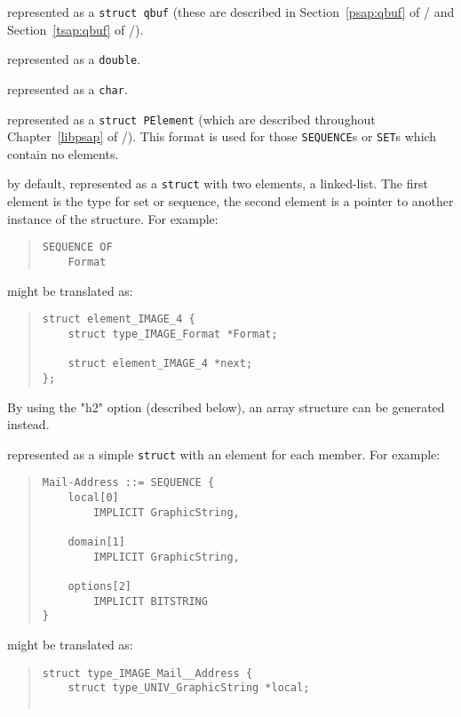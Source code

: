 \begin{describe}
\item	[\verb"OCTET STRING":] represented as a \verb"struct qbuf"
	(these are described in Section~\ref{psap:qbuf} of \volone/
	and Section~\ref{tsap:qbuf} of \voltwo/).

\item	[\verb"REAL":] represented as a \verb"double".

\item	[\verb"NULL":]	represented as a \verb"char".

\item	[\verb"SEQUENCE"/\verb"SET"/\verb"ANY":]
	represented as a \verb"struct PElement"
	(which are described throughout Chapter~\ref{libpsap} of \volone/).
	This format is used for those \verb"SEQUENCE"s or \verb"SET"s which
	contain no elements.

\item	[\verb"SEQUENCE OF"/\verb"SET OF":]
	by default, represented as a \verb"struct" with two elements,
	a linked-list.
	The first element is the type for set or sequence,
	the second element is a pointer to another instance of the structure.
	For example:
\begin{quote}\small\begin{verbatim}
SEQUENCE OF
    Format
\end{verbatim}\end{quote}
	might be translated as:
\begin{quote}\small\begin{verbatim}
struct element_IMAGE_4 {
    struct type_IMAGE_Format *Format;

    struct element_IMAGE_4 *next;
};
\end{verbatim}\end{quote}
	By using the \switch"h2" option (described below),
	an array structure can be generated instead.

\item	[\verb"SEQUENCE"/\verb"SET":] represented as a simple \verb"struct"
with an element for each member.
For example:
\begin{quote}\small\begin{verbatim}
Mail-Address ::= SEQUENCE {
    local[0]
        IMPLICIT GraphicString,

    domain[1]
        IMPLICIT GraphicString,

    options[2]
        IMPLICIT BITSTRING
}
\end{verbatim}\end{quote}
might be translated as:
\begin{quote}\small\begin{verbatim}
struct type_IMAGE_Mail__Address {
    struct type_UNIV_GraphicString *local;


\end{verbatim}
\end{quote}
\end{describe}
